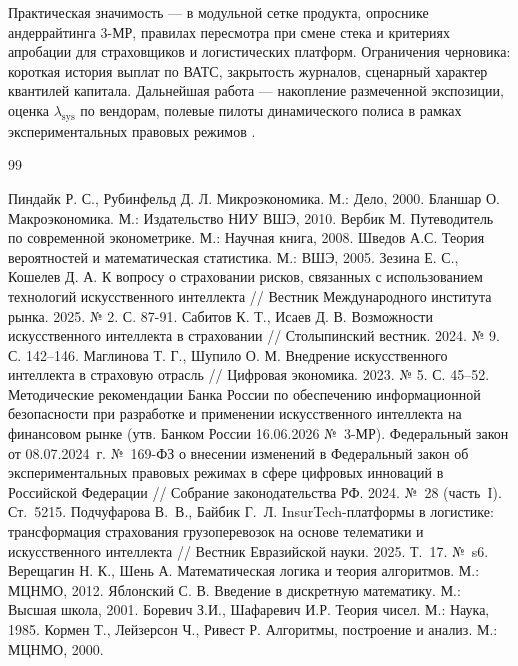 \documentclass[a4paper,14pt]{extarticle}
\begin{document}
Практическая значимость --- в модульной сетке продукта, опроснике андеррайтинга 3-МР, правилах пересмотра при смене стека и критериях апробации для страховщиков и логистических платформ. Ограничения черновика: короткая история выплат по ВАТС, закрытость журналов, сценарный характер квантилей капитала. Дальнейшая работа --- накопление размеченной экспозиции, оценка $\lambda_{\mathrm{sys}}$ по вендорам, полевые пилоты динамического полиса в рамках экспериментальных правовых режимов \cite{fz169}.
\newpage

\begin{thebibliography}{99}

 Пиндайк Р. С., Рубинфельд Д. Л. Микроэкономика. М.: Дело, 2000.
 Бланшар О. Макроэкономика. М.: Издательство НИУ ВШЭ, 2010.
 Вербик М. Путеводитель по современной эконометрике. М.: Научная книга, 2008.
 Шведов А.С. Теория вероятностей и математическая статистика. М.: ВШЭ, 2005.
 Зезина Е. С., Кошелев Д. А. К вопросу о страховании рисков, связанных с использованием технологий искусственного интеллекта // Вестник Международного института рынка. 2025. № 2. С. 87-91.
 Сабитов К. Т., Исаев Д. В. Возможности искусственного интеллекта в страховании // Столыпинский вестник. 2024. № 9. С. 142–146.
 Маглинова Т. Г., Шупило О. М. Внедрение искусственного интеллекта в страховую отрасль // Цифровая экономика. 2023. № 5. С. 45–52.
 Методические рекомендации Банка России по обеспечению информационной безопасности при разработке и применении искусственного интеллекта на финансовом рынке (утв. Банком России 16.06.2026 №~3-МР).
 Федеральный закон от 08.07.2024~г. №~169-ФЗ о внесении изменений в Федеральный закон об экспериментальных правовых режимах в сфере цифровых инноваций в Российской Федерации // Собрание законодательства РФ. 2024. №~28 (часть~I). Ст.~5215.
 Подчуфарова В.~В., Байбик Г.~Л. InsurTech-платформы в логистике: трансформация страхования грузоперевозок на основе телематики и искусственного интеллекта // Вестник Евразийской науки. 2025. Т.~17. №~s6.
 Верещагин Н. К., Шень А. Математическая логика и теория алгоритмов. М.: МЦНМО, 2012.
 Яблонский С. В. Введение в дискретную математику. М.: Высшая школа, 2001.
 Боревич З.И., Шафаревич И.Р. Теория чисел. М.: Наука, 1985.
 Кормен Т., Лейзерсон Ч., Ривест Р. Алгоритмы, построение и анализ. М.: МЦНМО, 2000.

\end{thebibliography}
\end{document}
